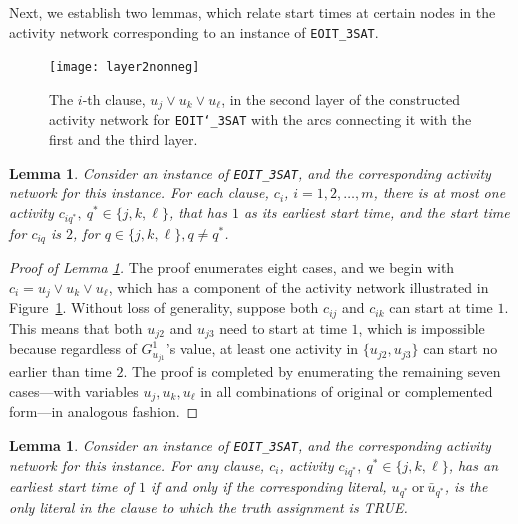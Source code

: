 \documentclass[11pt]{article}
\newtheorem{lemma}[theorem]{Lemma}
\newcommand{\tcb}{\textcolor{blue}}
\begin{document}
	Next, we establish two lemmas, which relate start times at certain nodes in the activity network corresponding to an instance of \verb|EOIT_3SAT|.
	\begin{figure}
		\centering
		\texttt{[image: layer2nonneg]}
		\caption{The \(i\)-th clause, \(u_{j} \vee u_{k} \vee u_{\ell}\), in the second layer of the constructed activity network for \texttt{EOIT\char`_3SAT} with the arcs connecting it with the first and the third layer.}
		\label{fig:layer2nonneg}
	\end{figure}
	\begin{lemma} \label{lemma:onlyOne}
	Consider an instance of \verb|EOIT_3SAT|, and the corresponding activity network for this instance.
		For each clause, \(c_i\), 
		\(i = 1,2,\dots,m\), there is at most one activity \(c_{iq^*},\ q^* \in \{j,k,\ell\}\), that has $1$ as its earliest start time, and the start time for \(c_{iq}\) is \(2\), for \(q \in \{j,k,\ell\}, q \neq q^*\).
	\end{lemma}
	\begin{proof}[Proof of Lemma \ref{lemma:onlyOne}]
    	The proof enumerates eight cases, and we begin with $c_i=u_j \vee u_k \vee u_\ell$, which has a component of the activity network illustrated in Figure~\ref{fig:layer2nonneg}. Without loss of generality, suppose both \(c_{ij}\) and \(c_{ik}\) can start at time \(1\). This means that both \(u_{j2}\) and \(u_{j3}\) need to start at time \(1\), which is impossible because regardless of \(G^1_{u_{j1}}\)'s value, at least one activity in \(\{u_{j2},u_{j3}\}\) can start no earlier than time \(2\). The proof is completed by enumerating the remaining seven cases---with variables $u_j, u_k, u_\ell$ in all combinations of original or complemented form---in analogous fashion.
	\end{proof}
	\begin{lemma} \label{lemma:iff}
		Consider an instance of \verb|EOIT_3SAT|, and the corresponding activity network for this instance.
		For any clause, \(c_i\), 
		activity \(c_{iq^*},\ q^* \in \{j,k,\ell\}\), has an earliest start time of \(1\) if and only if the corresponding {literal}, \(u_{q^*} \ \mbox{or} \ \bar{u}_{q^*} \), is the only {literal} in the clause to which the truth assignment is TRUE.
	\end{lemma}
\end{document}
